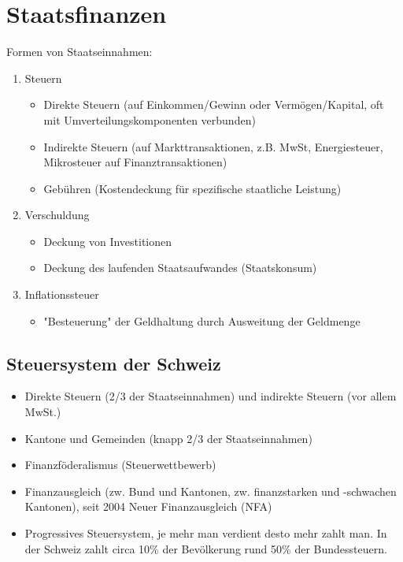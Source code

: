 \section{Staatsfinanzen}
Formen von Staatseinnahmen:
\begin{enumerate}
	\item Steuern
	\begin{itemize}
		\item Direkte Steuern (auf Einkommen/Gewinn oder Vermögen/Kapital, oft mit Umverteilungskomponenten verbunden)
		\item Indirekte Steuern (auf Markttransaktionen, z.B. MwSt, Energiesteuer, Mikrosteuer auf Finanztransaktionen)
		\item Gebühren (Kostendeckung für spezifische staatliche Leistung)
	\end{itemize}
	\item Verschuldung
	\begin{itemize}
		\item Deckung von Investitionen 
		\item Deckung des laufenden Staatsaufwandes (Staatskonsum)
	\end{itemize}
	\item Inflationssteuer
	\begin{itemize}
		\item "Besteuerung" der Geldhaltung durch Ausweitung der Geldmenge 
	\end{itemize}
\end{enumerate}

\subsection{Steuersystem der Schweiz}
\begin{itemize}
	\item Direkte Steuern (2/3 der Staatseinnahmen) und indirekte Steuern (vor allem MwSt.)
	\item Kantone und Gemeinden (knapp 2/3 der Staatseinnahmen)
	\item Finanzföderalismus (Steuerwettbewerb)
	\item Finanzausgleich (zw. Bund und Kantonen, zw. finanzstarken und -schwachen Kantonen), seit 2004 Neuer Finanzausgleich (NFA)
	\item Progressives Steuersystem, je mehr man verdient desto mehr zahlt man. In der Schweiz zahlt circa 10\% der Bevölkerung rund 50\% der Bundessteuern. 
\end{itemize}	

